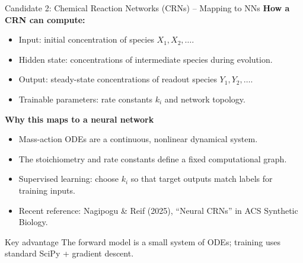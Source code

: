 \documentclass[aspectratio=169,11pt]{beamer}
\begin{document}
\begin{frame}{Candidate 2: Chemical Reaction Networks (CRNs) -- Mapping to NNs}
  \small
  \textbf{How a CRN can compute:}
  \begin{itemize}
    \item Input: initial concentration of species $X_1, X_2, \dots$.
    \item Hidden state: concentrations of intermediate species during evolution.
    \item Output: steady-state concentrations of readout species $Y_1, Y_2, \dots$.
    \item Trainable parameters: rate constants $k_i$ and network topology.
  \end{itemize}

  \vspace{0.15cm}
  \textbf{Why this maps to a neural network}
  \begin{itemize}
    \item Mass-action ODEs are a continuous, nonlinear dynamical system.
    \item The stoichiometry and rate constants define a fixed computational graph.
    \item Supervised learning: choose $k_i$ so that target outputs match labels for training inputs.
    \item Recent reference: Nagipogu \& Reif (2025), ``Neural CRNs'' in ACS Synthetic Biology.
  \end{itemize}

  \vspace{0.15cm}
  \begin{block}{Key advantage}
    The forward model is a small system of ODEs; training uses standard SciPy + gradient descent.
  \end{block}
\end{frame}
\end{document}
